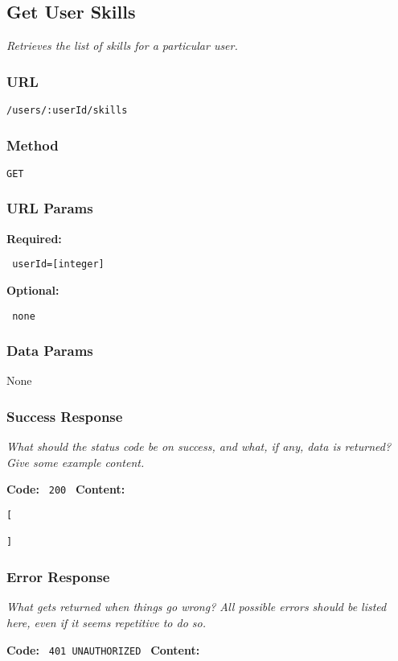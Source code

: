 \subsection{Get User Skills}
	\textit{Retrieves the list of skills for a particular user.}

	\subsubsection{URL}
		\texttt{/users/:userId/skills}

	\subsubsection{Method}
		\texttt{GET}

	\subsubsection{URL Params}

		\textbf{Required:}

		\verb| userId=[integer] |

		\textbf{Optional:}

		\verb| none |

	\subsubsection{Data Params}
		None

	\subsubsection{Success Response}
		\textit{What should the status code be on success, and what, if any, data is returned? Give some example content.}

		\textbf{Code:} \verb| 200 |
		\textbf{Content:}

		\begin{lstlisting}
[
	
]
		\end{lstlisting}

	\subsubsection{Error Response}
		\textit{What gets returned when things go wrong? All possible errors should be listed here, even if it seems repetitive to do so.}

		\textbf{Code:} \verb| 401 UNAUTHORIZED |
		\textbf{Content:}

